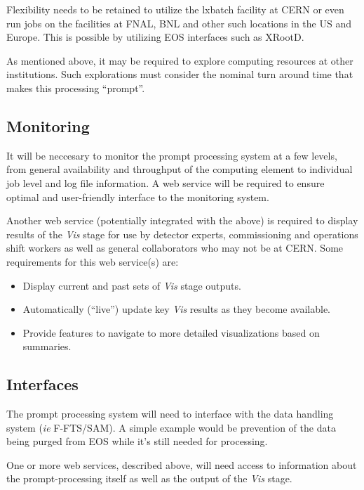 \documentclass[pdftex,12pt,letter]{article}
\begin{document}
Flexibility needs to be retained to utilize the lxbatch facility at CERN or even run jobs on the facilities at FNAL, BNL and other such locations
in the US and Europe. This is possible by utilizing EOS interfaces such as XRootD.

As mentioned above, it may be required to explore computing resources
at other institutions.  Such explorations must consider the nominal
turn around time that makes this processing ``prompt''.

\subsection{Monitoring}
It will be neccesary to monitor the prompt processing system at a few
levels, from general availability and throughput of the computing
element to individual job level and log file information.  A web
service will be required to ensure optimal and user-friendly interface
to the monitoring system.

Another web service (potentially integrated with the above) is
required to display results of the \textit{Vis} stage for use by
detector experts, commissioning and operations shift workers as well
as general collaborators who may not be at CERN.  Some requirements
for this web service(s) are:

\begin{itemize}
\item Display current and past sets of \textit{Vis} stage outputs.
\item Automatically (``live'') update key \textit{Vis} results as they become available.
\item Provide features to navigate to more detailed visualizations based on summaries.
\end{itemize}


\subsection{Interfaces}
The prompt processing system will need to interface with the data handling system (\textit{ie} F-FTS/SAM). A simple example
would be prevention of the data being purged from EOS while it's still needed for processing.

One or more web services, described above, will need access to
information about the prompt-processing itself as well as the output
of the \textit{Vis} stage.
\end{document}
